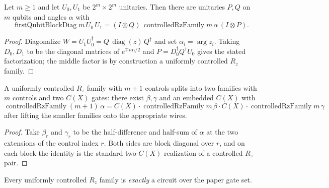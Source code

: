 \begin{lemma}
  \label{lem:demux}
  \leanok
  Let $m \ge 1$ and let $U_0, U_1$ be $2^m \times 2^m$ unitaries.  Then there
  are unitaries $P, Q$ on $m$ qubits and angles $\alpha$ with
  \[
    \operatorname{firstQubitBlockDiag} m\, U_0\, U_1
      = (I \otimes Q)\,
        \operatorname{controlledRzFamily} m\, \alpha\,
        (I \otimes P).
  \]
\end{lemma}

\begin{proof}
  \leanok
  Diagonalize $W = U_1 U_0^\dagger = Q\,\operatorname{diag}(z)\,Q^\dagger$ and
  set $\alpha_i = \arg z_i$.  Taking $D_{0}, D_1$ to be the diagonal matrices
  of $e^{\mp i\alpha_i/2}$ and $P = D_0^\dagger Q^\dagger U_0$ gives the stated
  factorization; the middle factor is by construction a uniformly controlled
  $R_z$ family.
\end{proof}

\begin{lemma}
  \label{lem:mottonen}
  \leanok
  A uniformly controlled $R_z$ family with $m+1$ controls splits into two
  families with $m$ controls and two $C(X)$ gates: there exist $\beta, \gamma$
  and an embedded $C(X)$ with
  \[
    \operatorname{controlledRzFamily}(m{+}1)\,\alpha
      = C(X)\cdot \operatorname{controlledRzFamily} m\, \beta
        \cdot C(X)\cdot \operatorname{controlledRzFamily} m\, \gamma
  \]
  after lifting the smaller families onto the appropriate wires.
\end{lemma}

\begin{proof}
  \leanok
  Take $\beta_r$ and $\gamma_r$ to be the half-difference and half-sum of
  $\alpha$ at the two extensions of the control index $r$.  Both sides are
  block diagonal over $r$, and on each block the identity is the standard
  two-$C(X)$ realization of a controlled $R_z$ pair.
\end{proof}

\begin{lemma}
  \label{lem:crz_family_synth}
  \leanok
  Every uniformly controlled $R_z$ family is \emph{exactly} a circuit over the
  paper gate set.
\end{lemma}

